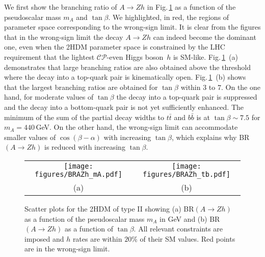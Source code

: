 \documentclass[12pt]{article}
\newcommand{\abbrev}{\scalefont{.9}}
\newcommand{\fig}[1]{Fig.\,\ref{#1}}
\newcommand{\lhc}{{\abbrev LHC}}
\newcommand{\sm}{{\abbrev SM}}
\newcommand{\thdm}{{\abbrev 2HDM}}
\newcommand{\cp}{{\abbrev $\mathcal{CP}$}}
\begin{document}
We first show the branching ratio of $A\to Zh$ in
\fig{fig:crbr} as a function of the pseudoscalar mass $m_A$ and $\tan\beta$.
We highlighted, in red, the regions of parameter
space corresponding to the wrong-sign limit. It is clear from the figures that
in the wrong-sign limit the decay $A\to Zh$ can indeed become the dominant one, even when the \thdm{} parameter
space is constrained by the \lhc{} requirement that the lightest \cp{}-even Higgs boson~$h$ is \sm{}-like.
\fig{fig:crbr}~(a) demonstrates that large branching ratios are also obtained
above the threshold where the decay into a top-quark pair is kinematically open.
\fig{fig:crbr}~(b) shows that the largest branching ratios are obtained
for $\tan\beta$ within $3$ to $7$. On the one hand, for moderate values
of $\tan\beta$ the decay into a top-quark pair is suppressed and the decay
into a bottom-quark pair is not yet sufficiently enhanced.
The minimum of the sum of the partial decay widths
to $t\bar t$ and $b\bar b$ is at $\tan\beta\sim 7.5$ for $m_A=440$\,GeV.
On the other hand, the wrong-sign limit can accommodate smaller values of $\cos(\beta-\alpha)$ with
increasing $\tan\beta$, which explains why BR$(A\to Zh)$ is reduced with increasing
$\tan\beta$.
%
\begin{figure}[t]
\begin{tabular}{cc}
\texttt{[image: figures/BRAZh\_mA.pdf]}&
\texttt{[image: figures/BRAZh\_tb.pdf]}\\
 (a) & (b)
\end{tabular}
\caption{Scatter plots for the \thdm{} of type II showing
(a) BR$(A \to Zh)$ as a function of the pseudoscalar mass $m_A$ in GeV and
(b) BR$(A\to Zh)$ as a function of $\tan\beta$.
All relevant constraints are imposed and $h$ rates are within $20\%$ of their \sm{} values.
Red points are in the wrong-sign limit.
}
\label{fig:crbr}
\end{figure}
\end{document}
